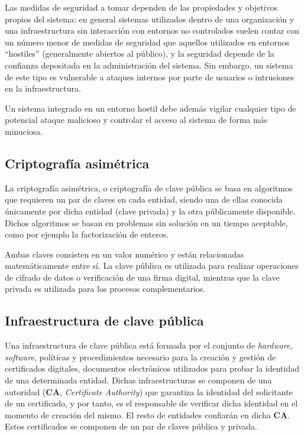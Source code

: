 Las medidas de seguridad a tomar dependen de las propiedades y objetivos propios del sistema: en general sistemas utilizados dentro de una organización y una infraestructura sin interacción con entornos no controlados suelen contar con un número menor de medidas de seguridad que aquellos utilizados en entornos ``hostiles'' (generalmente abiertos al público), y la seguridad depende de la confianza depositada en la administración del sistema. Sin embargo, un sistema de este tipo es vulnerable a ataques internos por parte de usuarios o intrusiones en la infraestructura.

Un sistema integrado en un entorno hostil debe además vigilar cualquier tipo de potencial ataque malicioso y controlar el acceso al sistema de forma más minuciosa.

\subsection{Criptografía asimétrica}

La criptografía asimétrica, o criptografía de clave pública se basa en algoritmos que requieren un par de claves en cada entidad, siendo una de ellas conocida únicamente por dicha entidad (clave privada) y la otra públicamente disponible. Dichos algoritmos se basan en problemas sin solución en un tiempo aceptable, como por ejemplo la factorización de enteros.

Ambas claves consisten en un valor numérico y están relacionadas matemáticamente entre sí. La clave pública es utilizada para realizar operaciones de cifrado de datos o verificación de una firma digital, mientras que la clave privada es utilizada para los procesos complementarios.

\subsection{Infraestructura de clave pública}

Una infraestructura de clave pública está formada por el conjunto de \textit{hardware}, \textit{software}, políticas y procedimientos necesario para la creación y gestión de certificados digitales, documentos electrónicos utilizados para probar la identidad de una determinada entidad. Dichas infraestructuras se componen de una autoridad (\textbf{CA}, \textit{Certificate Authority}) que garantiza la identidad del solicitante de un certificado, y por tanto, es el responsable de verificar dicha identidad en el momento de creación del mismo. El resto de entidades confiarán en dicha \textbf{CA}. Estos certificados se componen de un par de claves pública y privada.

